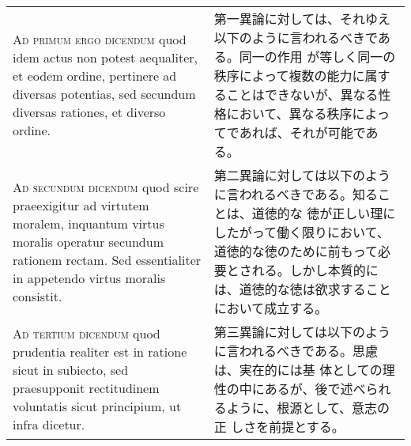 \documentclass[10pt]{jsarticle}
\begin{document}
\begin{longtable}{p{21em}p{21em}}
{\scshape Ad primum ergo dicendum} quod idem actus non potest
aequaliter, et eodem ordine, pertinere ad diversas potentias, sed
secundum diversas rationes, et diverso ordine.

&

第一異論に対しては、それゆえ以下のように言われるべきである。同一の作用
が等しく同一の秩序によって複数の能力に属することはできないが、異なる性
格において、異なる秩序によってであれば、それが可能である。

\\

{\scshape Ad secundum dicendum} quod scire praeexigitur ad virtutem
moralem, inquantum virtus moralis operatur secundum rationem
rectam. Sed essentialiter in appetendo virtus moralis consistit.

&

第二異論に対しては以下のように言われるべきである。知ることは、道徳的な
徳が正しい理にしたがって働く限りにおいて、道徳的な徳のために前もって必
要とされる。しかし本質的には、道徳的な徳は欲求することにおいて成立する。

\\

{\scshape Ad tertium dicendum} quod prudentia realiter est in ratione
sicut in subiecto, sed praesupponit rectitudinem voluntatis sicut
principium, ut infra dicetur.

&

第三異論に対しては以下のように言われるべきである。思慮は、実在的には基
体としての理性の中にあるが、後で述べられるように、根源として、意志の正
しさを前提とする。


\end{longtable}
\end{document}
